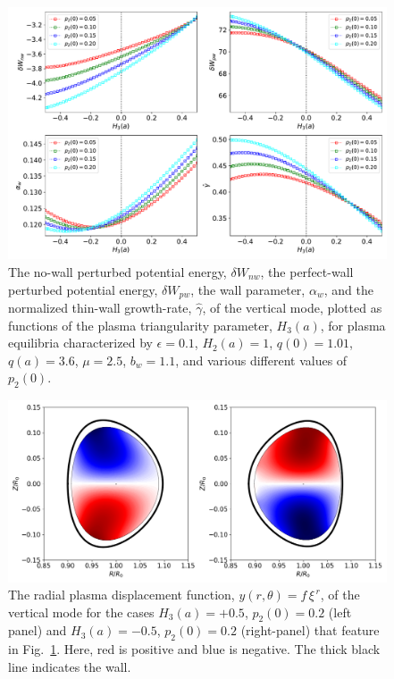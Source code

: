 \documentclass[12pt,prb,aps]{revtex4-1}
\begin{document}
\begin{figure}
\centerline{\includegraphics[width=\textwidth]{Fig4.pdf}}
\caption{The no-wall perturbed potential energy, $\delta W_{nw}$, the perfect-wall perturbed potential energy, $\delta W_{pw}$, the wall
parameter, $\alpha_w$, and the normalized thin-wall growth-rate, $\hat{\gamma}$,  of the  vertical  mode, plotted as  functions of the
plasma triangularity parameter, $H_3(a)$, for plasma equilibria characterized by  $\epsilon=0.1$, $H_2(a)=1$, $q(0)=1.01$, $q(a)=3.6$,  $\mu=2.5$, $b_w=1.1$, and
various different values of $p_2(0)$.  \label{fig4}}
\end{figure}

\newpage
\begin{figure}
\centerline{\includegraphics[width=\textwidth]{Fig5.png}}
\caption{The radial plasma displacement function, $y(r,\theta)=f\,\xi^{\,r}$,  of the vertical mode for the cases $H_3(a)=+0.5$, $p_2(0)=0.2$ (left panel) and $H_3(a)=-0.5$, $p_2(0)=0.2$  (right-panel) that feature in Fig.~\ref{fig4}.
Here, red is positive and blue is negative. The thick black line indicates the wall. \label{fig5}}
\end{figure}
\end{document}
